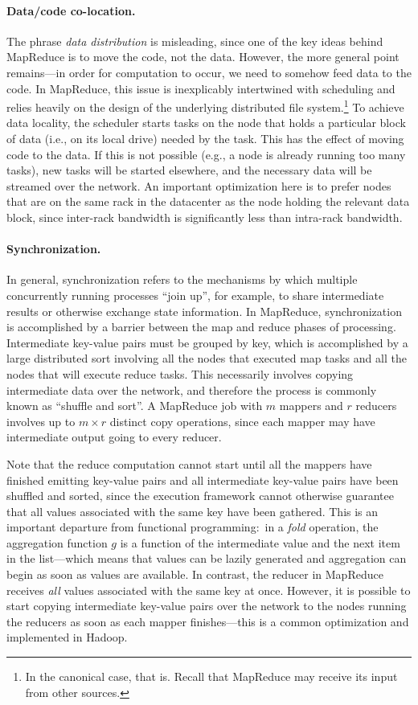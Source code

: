 \paragraph{Data/code co-location.}  The phrase {\it data
  distribution} is misleading, since one of the key ideas behind
MapReduce is to move the code, not the data.  However, the more
general point remains---in order for computation to occur, we need to
somehow feed data to the code.  In MapReduce, this issue is
inexplicably intertwined with scheduling and relies heavily on the
design of the underlying distributed file system.\footnote{In the
canonical case, that is.  Recall that MapReduce may receive its input
from other sources.} To achieve data locality, the scheduler starts
tasks on the node that holds a particular block of data (i.e., on its
local drive) needed by the task.  This has the effect of moving code
to the data.  If this is not possible (e.g., a node is already running
too many tasks), new tasks will be started elsewhere, and the
necessary data will be streamed over the network.  An important
optimization here is to prefer nodes that are on the same rack in the
datacenter as the node holding the relevant data block, since
inter-rack bandwidth is significantly less than intra-rack bandwidth.

\paragraph{Synchronization.} In general, synchronization refers to
the mechanisms by which multiple concurrently running processes ``join
up'', for example, to share intermediate results or otherwise exchange
state information.  In MapReduce, synchronization is accomplished by a
barrier between the map and reduce phases of processing.  Intermediate
key-value pairs must be grouped by key, which is accomplished by a
large distributed sort involving all the nodes that executed map tasks
and all the nodes that will execute reduce tasks.  This necessarily
involves copying intermediate data over the network, and therefore the
process is commonly known as ``shuffle and sort''.  A MapReduce job
with $m$ mappers and $r$ reducers involves up to $m \times r$ distinct
copy operations, since each mapper may have intermediate output going
to every reducer.

Note that the reduce computation cannot start until all the mappers
have finished emitting key-value pairs and all intermediate key-value
pairs have been shuffled and sorted, since the execution framework
cannot otherwise guarantee that all values associated with the same
key have been gathered.  This is an important departure from
functional programming:\ in a {\it fold} operation, the aggregation
function $g$ is a function of the intermediate value and the next item
in the list---which means that values can be lazily generated and
aggregation can begin as soon as values are available.  In contrast,
the reducer in MapReduce receives {\it all} values associated with the
same key at once.  However, it is possible to start copying
intermediate key-value pairs over the network to the nodes running the
reducers as soon as each mapper finishes---this is a common
optimization and implemented in Hadoop.

